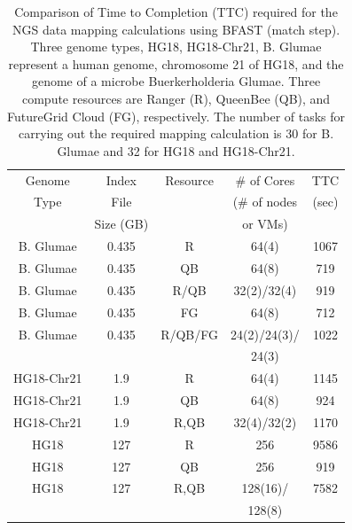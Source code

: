 \documentclass{sig-alternate}
\begin{document}
 \begin{table}
\small
 \begin{tabular}{|c|c|c|c|c|} 
 \hline 
Genome & Index           & Resource    & \# of Cores             &	TTC  \\
  Type               &  File      & & (\# of nodes & (sec)\\  
  & Size (GB)  &   & or VMs) & \\   \hline
 B. Glumae &0.435& R&	64(4)	&1067 \\
\hline                  
B. Glumae &0.435& QB	&	64(8)	&719 \\
\hline
 B. Glumae &0.435&R/QB	&	32(2)/32(4) &919 \\
\hline
 B. Glumae &0.435& FG &	64(8)	&712 \\
\hline
 B. Glumae &0.435 &  R/QB/FG &	24(2)/24(3)/& 1022\\
& &  & 24(3) & \\  \hline  \hline

HG18-Chr21 &1.9& R	&	64(4)&1145 \\
\hline
HG18-Chr21 &1.9& QB	&	64(8)	&924 \\
\hline
HG18-Chr21 &1.9& R,QB	&	32(4)/32(2)	&1170 \\
\hline
\hline
HG18 &127& R	&	256	&9586\\
\hline
HG18 &127& QB	&	256	&919 \\
\hline
HG18 &127& R,QB	&	128(16)/&7582 \\
&  &  &   128(8)  &  \\
\hline
\end{tabular}
\caption{Comparison of Time to Completion (TTC) required for the NGS data mapping calculations using BFAST (match step).  Three genome types, HG18, HG18-Chr21, B. Glumae represent a human genome, chromosome 21 of HG18, and the genome of a microbe Buerkerholderia Glumae.  Three compute resources are Ranger (R), QueenBee (QB), and FutureGrid Cloud (FG), respectively.  The number of tasks for carrying out the required mapping calculation is 30 for B. Glumae and 32 for HG18 and HG18-Chr21.}

  \label{table:NGS-Distributed} 
\end{table}
\end{document}
